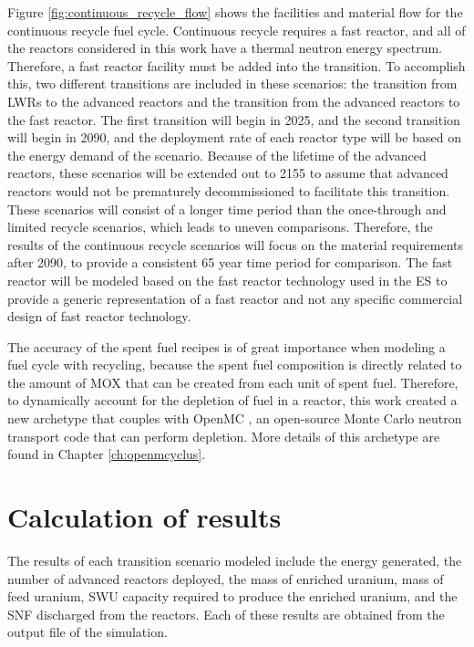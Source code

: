 Figure \ref{fig:continuous_recycle_flow} shows the facilities and material 
flow for the continuous recycle fuel cycle. Continuous recycle 
requires a fast reactor, and all of the reactors considered in this 
work have a thermal neutron energy spectrum. Therefore, a fast reactor 
facility 
must be added into the transition. To accomplish this, two different 
transitions are included in these scenarios: the transition from 
\glspl{LWR} to the advanced reactors and the transition from the 
advanced reactors to the fast reactor. The first transition will begin 
in 2025, and the second transition will begin in 2090, and the deployment 
rate of each reactor type will be based on the energy demand of the 
scenario. Because of the lifetime of the advanced reactors, these scenarios 
will be extended out to 2155 to assume that advanced reactors would not 
be prematurely decommissioned to facilitate this transition. These 
scenarios will consist of a longer time period than the once-through 
and limited recycle scenarios, which leads to uneven comparisons. Therefore, 
the results of the continuous recycle scenarios will focus on the 
material requirements after 2090, to provide a consistent 65 year 
time period for comparison. 
The fast reactor will be modeled 
based on the fast reactor technology used in the \gls{ES} 
\cite{wigeland_nuclear_2014} to provide a generic representation of 
a fast reactor and not any specific commercial design of fast reactor 
technology. 



The accuracy of the spent fuel recipes is of great importance 
when modeling a fuel cycle with recycling, because the spent fuel 
composition is directly related to the amount of \gls{MOX} that 
can be created from each unit of spent fuel. Therefore, to 
dynamically account for the depletion of fuel in a reactor, 
this work created a new \Cyclus archetype that couples \Cyclus with 
OpenMC \cite{romano_openmc:_2015}, an open-source Monte Carlo 
neutron transport code that can perform depletion. More details 
of this archetype are found in Chapter \ref{ch:openmcyclus}.
 

\section{Calculation of results} \label{sec:results_calc}
The results of each transition scenario modeled include the energy generated, 
the number of advanced reactors deployed, the mass of enriched uranium, 
mass of feed uranium, \gls{SWU} capacity required to produce the enriched 
uranium, and the \gls{SNF} discharged from the reactors. Each of these results 
are obtained from the \Cyclus output file of the simulation. 

